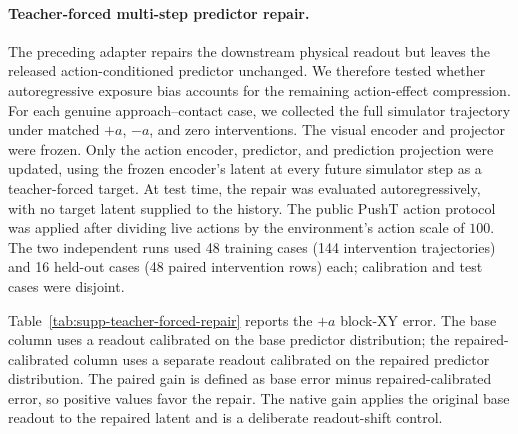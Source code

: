 \documentclass{article}
\begin{document}
\paragraph{Teacher-forced multi-step predictor repair.}
The preceding adapter repairs the downstream physical readout but leaves the
released action-conditioned predictor unchanged. We therefore tested whether
autoregressive exposure bias accounts for the remaining action-effect
compression. For each genuine approach--contact case, we collected the full
simulator trajectory under matched $+a$, $-a$, and zero interventions. The
visual encoder and projector were frozen. Only the action encoder, predictor,
and prediction projection were updated, using the frozen encoder's latent at
every future simulator step as a teacher-forced target. At test time, the
repair was evaluated autoregressively, with no target latent supplied to the
history. The public PushT action protocol was applied after dividing live
actions by the environment's action scale of $100$. The two independent runs
used 48 training cases (144 intervention trajectories) and 16 held-out cases
(48 paired intervention rows) each; calibration and test cases were disjoint.

Table~\ref{tab:supp-teacher-forced-repair} reports the $+a$ block-XY error.
The base column uses a readout calibrated on the base predictor distribution;
the repaired-calibrated column uses a separate readout calibrated on the
repaired predictor distribution. The paired gain is defined as base error
minus repaired-calibrated error, so positive values favor the repair. The
native gain applies the original base readout to the repaired latent and is a
deliberate readout-shift control.
\end{document}
